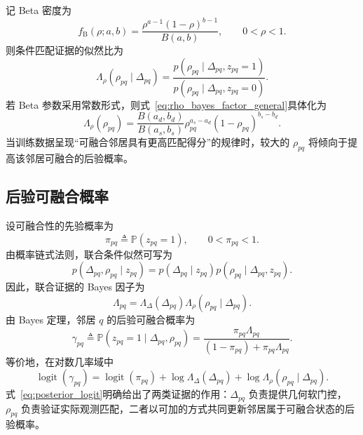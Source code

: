 \documentclass[11pt,a4paper]{ctexart}
\numberwithin{equation}{section}
\newcommand{\Pbb}{\mathbb{P}}
\newcommand{\logit}{\operatorname{logit}}
\begin{document}
记 Beta 密度为
\begin{equation}
    f_{\mathrm B}(\rho;a,b)
    =
    \frac{\rho^{a-1}(1-\rho)^{b-1}}
    {B(a,b)},
    \qquad 0<\rho<1.
    \label{eq:beta_pdf}
\end{equation}
则条件匹配证据的似然比为
\begin{equation}
    \Lambda_{\rho}(\rho_{pq}\mid\Delta_{pq})
    =
    \frac{
    p(\rho_{pq}\mid\Delta_{pq},z_{pq}=1)
    }{
    p(\rho_{pq}\mid\Delta_{pq},z_{pq}=0)
    }.
    \label{eq:rho_bayes_factor_general}
\end{equation}
若 Beta 参数采用常数形式，则式~\eqref{eq:rho_bayes_factor_general}具体化为
\begin{equation}
    \Lambda_{\rho}(\rho_{pq})
    =
    \frac{B(a_d,b_d)}{B(a_s,b_s)}
    \rho_{pq}^{a_s-a_d}
    (1-\rho_{pq})^{b_s-b_d}.
    \label{eq:rho_bayes_factor}
\end{equation}
当训练数据呈现``可融合邻居具有更高匹配得分''的规律时，较大的 $\rho_{pq}$ 将倾向于提高该邻居可融合的后验概率。

\subsection{后验可融合概率}

设可融合性的先验概率为
\begin{equation}
    \pi_{pq}
    \triangleq
    \Pbb(z_{pq}=1),
    \qquad
    0<\pi_{pq}<1.
    \label{eq:prior_pi}
\end{equation}
由概率链式法则，联合条件似然可写为
\begin{equation}
    p(\Delta_{pq},\rho_{pq}\mid z_{pq})
    =
    p(\Delta_{pq}\mid z_{pq})
    p(\rho_{pq}\mid\Delta_{pq},z_{pq}).
    \label{eq:conditional_factorization}
\end{equation}
因此，联合证据的 Bayes 因子为
\begin{equation}
    \Lambda_{pq}
    =
    \Lambda_{\Delta}(\Delta_{pq})
    \Lambda_{\rho}(\rho_{pq}\mid\Delta_{pq}).
    \label{eq:joint_bayes_factor}
\end{equation}
由 Bayes 定理，邻居 $q$ 的后验可融合概率为
\begin{equation}
    \boxed{
    \gamma_{pq}
    \triangleq
    \Pbb(z_{pq}=1\mid\Delta_{pq},\rho_{pq})
    =
    \frac{
    \pi_{pq}\Lambda_{pq}
    }{
    (1-\pi_{pq})+\pi_{pq}\Lambda_{pq}
    }
    }.
    \label{eq:posterior_fusibility}
\end{equation}
等价地，在对数几率域中
\begin{equation}
    \logit(\gamma_{pq})
    =
    \logit(\pi_{pq})
    +
    \log\Lambda_{\Delta}(\Delta_{pq})
    +
    \log\Lambda_{\rho}(\rho_{pq}\mid\Delta_{pq}).
    \label{eq:posterior_logit}
\end{equation}
式~\eqref{eq:posterior_logit}明确给出了两类证据的作用：$\Delta_{pq}$ 负责提供几何软门控，$\rho_{pq}$ 负责验证实际观测匹配，二者以可加的方式共同更新邻居属于可融合状态的后验概率。
\end{document}
